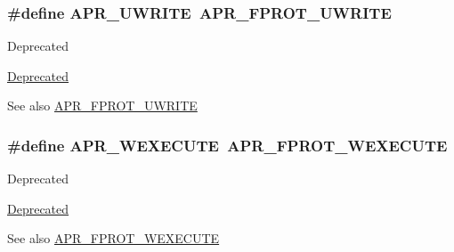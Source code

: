 \subsubsection[{\texorpdfstring{A\+P\+R\+\_\+\+U\+W\+R\+I\+TE}{APR_UWRITE}}]{\setlength{\rightskip}{0pt plus 5cm}\#define A\+P\+R\+\_\+\+U\+W\+R\+I\+TE~{\bf A\+P\+R\+\_\+\+F\+P\+R\+O\+T\+\_\+\+U\+W\+R\+I\+TE}}\hypertarget{group__apr__file__permissions_ga4faa7fdfa3bcda569dd1e23ae002c5e5}{}\label{group__apr__file__permissions_ga4faa7fdfa3bcda569dd1e23ae002c5e5}
\begin{DoxyRefDesc}{Deprecated}
\item[\hyperlink{deprecated__deprecated000012}{Deprecated}]\end{DoxyRefDesc}
\begin{DoxySeeAlso}{See also}
\hyperlink{group__apr__file__permissions_ga50b985779b15fbfdae0758e98ffb92af}{A\+P\+R\+\_\+\+F\+P\+R\+O\+T\+\_\+\+U\+W\+R\+I\+TE} 
\end{DoxySeeAlso}
\subsubsection[{\texorpdfstring{A\+P\+R\+\_\+\+W\+E\+X\+E\+C\+U\+TE}{APR_WEXECUTE}}]{\setlength{\rightskip}{0pt plus 5cm}\#define A\+P\+R\+\_\+\+W\+E\+X\+E\+C\+U\+TE~{\bf A\+P\+R\+\_\+\+F\+P\+R\+O\+T\+\_\+\+W\+E\+X\+E\+C\+U\+TE}}\hypertarget{group__apr__file__permissions_ga7bf4afea195c62f41aad1d3e94dcdac6}{}\label{group__apr__file__permissions_ga7bf4afea195c62f41aad1d3e94dcdac6}
\begin{DoxyRefDesc}{Deprecated}
\item[\hyperlink{deprecated__deprecated000021}{Deprecated}]\end{DoxyRefDesc}
\begin{DoxySeeAlso}{See also}
\hyperlink{group__apr__file__permissions_ga760d69c09b38ddf1e0aff09362d8ce11}{A\+P\+R\+\_\+\+F\+P\+R\+O\+T\+\_\+\+W\+E\+X\+E\+C\+U\+TE} 
\end{DoxySeeAlso}
